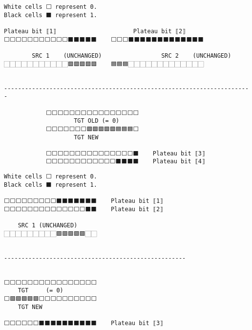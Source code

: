 \documentclass[varwidth=\maxdimen,margin=0.5cm,multi={verbatim}]{standalone}
\begin{document}
\begin{verbatim}
White cells ⬜ represent 0.
Black cells ⬛ represent 1.

Plateau bit ⟦1⟧                      Plateau bit ⟦2⟧
⬜⬜⬜⬜⬜⬜⬜⬜⬜⬜⬜⬛⬛⬛⬛⬛    ⬜⬜⬜⬛⬛⬛⬛⬛⬛⬛⬛⬛⬛⬛⬛⬛

        SRC 1    (UNCHANGED)                 SRC 2    (UNCHANGED)
🏻🏻🏻🏻🏻🏻🏻🏻🏻🏻🏻🟩🟩🟩🟩🟩    🟦🟦🟦🏻🏻🏻🏻🏻🏻🏻🏻🏻🏻🏻🏻🏻


-----------------------------------------------------------------------

            ⬜⬜⬜⬜⬜⬜⬜⬜⬜⬜⬜⬜⬜⬜⬜⬜
                    TGT OLD (= 0)
            ⬜⬜⬜⬜⬜⬜⬜🟩🟩🟩🟩🟩🟦🟦🟦⬜
                    TGT NEW

            ⬜⬜⬜⬜⬜⬜⬜⬜⬜⬜⬜⬜⬜⬜⬜⬛    Plateau bit ⟦3⟧
            ⬜⬜⬜⬜⬜⬜⬜⬜⬜⬜⬜⬜⬛⬛⬛⬛    Plateau bit ⟦4⟧
\end{verbatim}

\begin{verbatim}
White cells ⬜ represent 0.
Black cells ⬛ represent 1.

⬜⬜⬜⬜⬜⬜⬜⬜⬜⬛⬛⬛⬛⬛⬛⬛    Plateau bit ⟦1⟧
⬜⬜⬜⬜⬜⬜⬜⬜⬜⬜⬜⬜⬜⬜⬛⬛    Plateau bit ⟦2⟧
            
    SRC 1 (UNCHANGED)
🏻🏻🏻🏻🏻🏻🏻🏻🏻🟩🟩🟩🟩🟩🏻🏻


----------------------------------------------------


⬜⬜⬜⬜⬜⬜⬜⬜⬜⬜⬜⬜⬜⬜⬜⬜
    TGT     (= 0)
⬜🟩🟩🟩🟩🟩⬜⬜⬜⬜⬜⬜⬜⬜⬜⬜
    TGT NEW

⬜⬜⬜⬜⬜⬜⬛⬛⬛⬛⬛⬛⬛⬛⬛⬛    Plateau bit ⟦3⟧
\end{verbatim}
\end{document}
